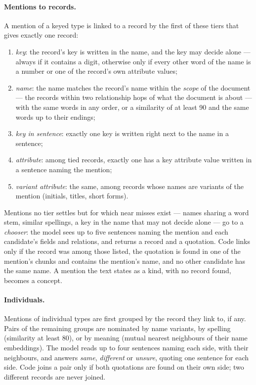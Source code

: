 \paragraph{Mentions to records.} A mention of a keyed type is linked to a record by the first of these tiers that
gives exactly one record:
\begin{enumerate}[nosep]
\item \emph{key}: the record's key is written in the name, and the key may decide alone --- always if it contains
a digit, otherwise only if every other word of the name is a number or one of the record's own attribute values;
\item \emph{name}: the name matches the record's name within the \emph{scope} of the document --- the records
within two relationship hops of what the document is about --- with the same words in any order, or a similarity of
at least 90 and the same words up to their endings;
\item \emph{key in sentence}: exactly one key is written right next to the name in a sentence;
\item \emph{attribute}: among tied records, exactly one has a key attribute value written in a sentence naming
the mention;
\item \emph{variant attribute}: the same, among records whose names are variants of the mention (initials, titles,
short forms).
\end{enumerate}
Mentions no tier settles but for which near misses exist --- names sharing a word stem, similar spellings, a key
in the name that may not decide alone --- go to a \emph{chooser}: the model sees up to five sentences naming the
mention and each candidate's fields and relations, and returns a record and a quotation. Code links only if the
record was among those listed, the quotation is found in one of the mention's chunks and contains the mention's
name, and no other candidate has the same name. A mention the text states as a kind, with no record found, becomes
a concept.

\paragraph{Individuals.} Mentions of individual types are first grouped by the record they link to, if any.
Pairs of the remaining groups are nominated by name variants, by spelling (similarity at least 80), or by
meaning (mutual nearest neighbours of their name embeddings). The model reads up to four sentences naming each
side, with their neighbours, and answers \emph{same}, \emph{different} or \emph{unsure}, quoting one sentence for
each side. Code joins a pair only if both quotations are found on their own side; two different records are never
joined.

